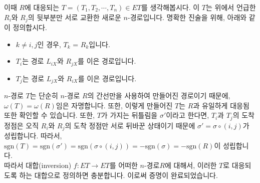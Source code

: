 \documentclass[a4paper]{article}
\begin{document}
이때 $R$에 대응되는 $T = (T_1, T_2, \cdots, T_n) \in ET$를 생각해봅시다. 이 $T$는 위에서 언급한 $R_i$와 $R_j$의 뒷부분만 서로 교환한 새로운 $n$-경로입니다. 명확한 진술을 위해, 아래와 같이 정의합시다.
\begin{itemize}
    \item $k \neq i,j$인 경우, $T_k$ = $R_k$입니다.
    \item $T_i$는 경로 $L_{iX}$와 $R_{jX}$를 이은 경로입니다.
    \item $T_j$는 경로 $L_{jX}$와 $R_{iX}$를 이은 경로입니다.
\end{itemize}
$n$-경로 $T$는 단순히 $n$-경로 $R$의 간선만을 사용하여 만들어진 경로이기 때문에, $\omega(T) = \omega(R)$임은 자명합니다. 또한, 이렇게 만들어진 $T$는 $R$과 유일하게 대응됨 또한 확인할 수 있습니다. 또한, $T$가 가지는 뒤틀림을 $\sigma'$이라고 한다면, $T_i$과 $T_j$의 도착 정점은 오직 $R_i$와 $R_j$의 도착 정점만 서로 뒤바꾼 상태이기 때문에 $\sigma' = \sigma \circ (i, j)$가 성립합니다. 따라서, $\mathrm{sgn}(T) = \mathrm{sgn}(\sigma') = \mathrm{sgn}(\sigma \circ (i, j)) = - \mathrm{sgn}(\sigma) = - \mathrm{sgn}(R)$이 성립합니다.\\
따라서 대합(inversion) $f : ET \rightarrow ET$를 어떠한 $n$-경로$R$에 대해서, 이러한 $T$로 대응되도록 하는 대합으로 정의하면 충분합니다. 이로써 증명이 완료되었습니다.

\newpage
\end{document}
